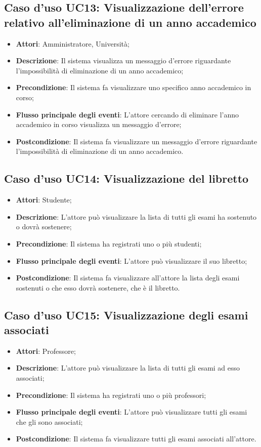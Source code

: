 \subsection{Caso d'uso \texorpdfstring{UC13}{UC13}: Visualizzazione dell'errore relativo all'eliminazione di un anno accademico}
\begin{itemize}
	\item \textbf{Attori}: Amministratore, Università;
	\item \textbf{Descrizione}: Il sistema visualizza un messaggio d'errore riguardante l'impossibilità di eliminazione di un anno accademico;
	\item \textbf{Precondizione}: Il sistema fa visualizzare uno specifico anno accademico in corso;
	\item \textbf{Flusso principale degli eventi}: L'attore cercando di eliminare l'anno accademico in corso visualizza un messaggio d'errore;
	\item \textbf{Postcondizione}: Il sistema fa visualizzare un messaggio d'errore riguardante l'impossibilità di eliminazione di un anno accademico.
	
\end{itemize}
\subsection{Caso d'uso \texorpdfstring{UC14}{UC14}: Visualizzazione del libretto}
\begin{itemize}
	\item \textbf{Attori}: Studente;
	\item \textbf{Descrizione}: L'attore può visualizzare la lista di tutti gli esami ha sostenuto o dovrà sostenere;
	\item \textbf{Precondizione}: Il sistema ha registrati uno o più studenti;
	\item \textbf{Flusso principale degli eventi}: L'attore può visualizzare il suo libretto;
	\item \textbf{Postcondizione}: Il sistema fa visualizzare all'attore la lista degli esami sostenuti o che esso dovrà sostenere, che è il libretto.
\end{itemize}
\subsection{Caso d'uso \texorpdfstring{UC15}{UC15}: Visualizzazione degli esami associati}
\begin{itemize}
	\item \textbf{Attori}: Professore;
	\item \textbf{Descrizione}: L'attore può visualizzare la lista di tutti gli esami ad esso associati;
	\item \textbf{Precondizione}: Il sistema ha registrati uno o più professori;
	\item \textbf{Flusso principale degli eventi}: L'attore può visualizzare tutti gli esami che gli sono associati;
	\item \textbf{Postcondizione}: Il sistema fa visualizzare tutti gli esami associati all'attore.
\end{itemize}
